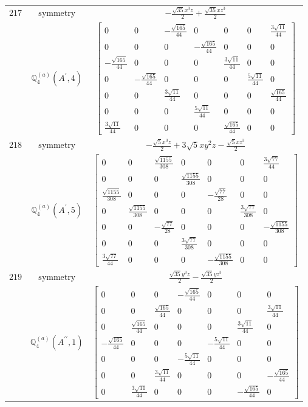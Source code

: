 \documentclass[fleqn,8pt,landscape]{jsarticle}
\begin{document}
\begin{longtable}{ccc}
$ 217 $ & $ \text{symmetry} $ & $ - \frac{\sqrt{35} x^{3} z}{2} + \frac{\sqrt{35} x z^{3}}{2} $ \\
$  $ & $ \mathbb{Q}_{4}^{(a)}(A^{\prime},4) $ & $ \begin{bmatrix} 0 & 0 & - \frac{\sqrt{165}}{44} & 0 & 0 & 0 & \frac{3 \sqrt{11}}{44} \\ 0 & 0 & 0 & - \frac{\sqrt{165}}{44} & 0 & 0 & 0 \\ - \frac{\sqrt{165}}{44} & 0 & 0 & 0 & \frac{3 \sqrt{11}}{44} & 0 & 0 \\ 0 & - \frac{\sqrt{165}}{44} & 0 & 0 & 0 & \frac{5 \sqrt{11}}{44} & 0 \\ 0 & 0 & \frac{3 \sqrt{11}}{44} & 0 & 0 & 0 & \frac{\sqrt{165}}{44} \\ 0 & 0 & 0 & \frac{5 \sqrt{11}}{44} & 0 & 0 & 0 \\ \frac{3 \sqrt{11}}{44} & 0 & 0 & 0 & \frac{\sqrt{165}}{44} & 0 & 0 \end{bmatrix} $ \\ \hline
$ 218 $ & $ \text{symmetry} $ & $ - \frac{\sqrt{5} x^{3} z}{2} + 3 \sqrt{5} x y^{2} z - \frac{\sqrt{5} x z^{3}}{2} $ \\
$  $ & $ \mathbb{Q}_{4}^{(a)}(A^{\prime},5) $ & $ \begin{bmatrix} 0 & 0 & \frac{\sqrt{1155}}{308} & 0 & 0 & 0 & \frac{3 \sqrt{77}}{44} \\ 0 & 0 & 0 & \frac{\sqrt{1155}}{308} & 0 & 0 & 0 \\ \frac{\sqrt{1155}}{308} & 0 & 0 & 0 & - \frac{\sqrt{77}}{28} & 0 & 0 \\ 0 & \frac{\sqrt{1155}}{308} & 0 & 0 & 0 & \frac{3 \sqrt{77}}{308} & 0 \\ 0 & 0 & - \frac{\sqrt{77}}{28} & 0 & 0 & 0 & - \frac{\sqrt{1155}}{308} \\ 0 & 0 & 0 & \frac{3 \sqrt{77}}{308} & 0 & 0 & 0 \\ \frac{3 \sqrt{77}}{44} & 0 & 0 & 0 & - \frac{\sqrt{1155}}{308} & 0 & 0 \end{bmatrix} $ \\ \hline
$ 219 $ & $ \text{symmetry} $ & $ \frac{\sqrt{35} y^{3} z}{2} - \frac{\sqrt{35} y z^{3}}{2} $ \\
$  $ & $ \mathbb{Q}_{4}^{(a)}(A^{\prime\prime},1) $ & $ \begin{bmatrix} 0 & 0 & 0 & - \frac{\sqrt{165}}{44} & 0 & 0 & 0 \\ 0 & 0 & \frac{\sqrt{165}}{44} & 0 & 0 & 0 & \frac{3 \sqrt{11}}{44} \\ 0 & \frac{\sqrt{165}}{44} & 0 & 0 & 0 & \frac{3 \sqrt{11}}{44} & 0 \\ - \frac{\sqrt{165}}{44} & 0 & 0 & 0 & - \frac{5 \sqrt{11}}{44} & 0 & 0 \\ 0 & 0 & 0 & - \frac{5 \sqrt{11}}{44} & 0 & 0 & 0 \\ 0 & 0 & \frac{3 \sqrt{11}}{44} & 0 & 0 & 0 & - \frac{\sqrt{165}}{44} \\ 0 & \frac{3 \sqrt{11}}{44} & 0 & 0 & 0 & - \frac{\sqrt{165}}{44} & 0 \end{bmatrix} $ \\ \hline

\end{longtable}
\end{document}
